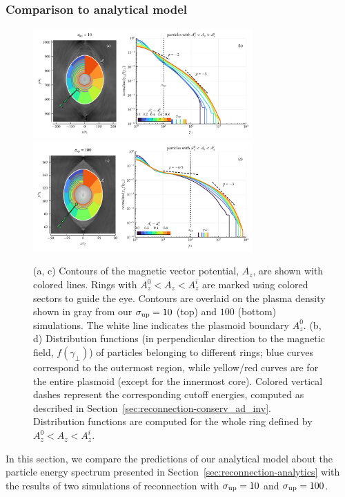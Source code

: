 \subsubsection{Comparison to analytical model}
\begin{figure}[htb]
    \centering
    \includegraphics[width=0.75\textwidth]{figures/ch2-reconnection/fig8_1.pdf}
    \includegraphics[width=0.75\textwidth]{figures/ch2-reconnection/fig8_2.pdf}
    \caption{(a, c) Contours of the magnetic vector potential, $A_z$, are shown with colored lines. Rings with $A_z^0 < A_z < A_z^i$ are marked using colored sectors to guide the eye. Contours are overlaid on the plasma density shown in gray from our $\sigma_{\rm up}=10$ (top) and $100$ (bottom) simulations. The white line indicates the plasmoid boundary $A_z^0$. (b, d) Distribution functions (in perpendicular direction to the magnetic field, $f(\gamma_\perp)$) of particles belonging to different rings; blue curves correspond to the outermost region, while yellow/red curves are for the entire plasmoid (except for the innermost core). Colored vertical dashes represent the corresponding cutoff energies, computed as described in Section~\ref{sec:reconnection-conserv_ad_inv}. Distribution functions are computed for the whole ring defined by $A_z^0 < A_z < A_z^i$.}
    \label{fig:rec-layers_df}
\end{figure}
In this section, we compare the predictions of our analytical model about the particle energy spectrum presented in Section~\ref{sec:reconnection-analytics} with the results of two simulations of reconnection with $\sigma_{\rm up}=10$ and $\sigma_{\rm up} = 100$.

